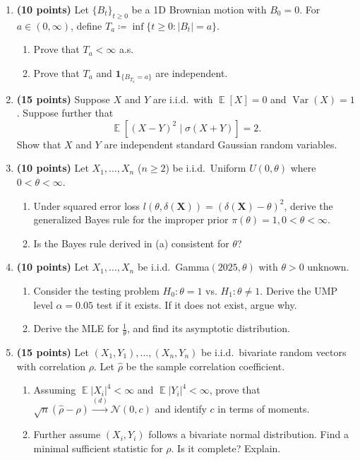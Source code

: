 \documentclass[11pt,a4paper]{article}
\DeclareMathOperator{\Var}{Var}
\DeclareMathOperator{\E}{\mathbb{E}}
\begin{document}
\begin{enumerate}[label=\textbf{\arabic*.}]
    \item \textbf{(10 points)} Let $\{B_t\}_{t \ge 0}$ be a 1D Brownian motion with $B_0 = 0$. For $a \in (0, \infty)$, define $T_a \coloneqq \inf\{t \ge 0 : |B_t| = a\}$.
    \begin{enumerate}[label=(\arabic*)]
        \item Prove that $T_a < \infty$ a.s.
        \item Prove that $T_a$ and $\mathbf{1}_{\{B_{T_a} = a\}}$ are independent.
    \end{enumerate}

    \item \textbf{(15 points)} Suppose $X$ and $Y$ are i.i.d.\ with $\E[X] = 0$ and $\Var(X) = 1$. Suppose further that
    \[
    \E [(X - Y)^2 \mid \sigma(X + Y)] = 2.
    \]
    Show that $X$ and $Y$ are independent standard Gaussian random variables.

    \item \textbf{(10 points)} Let $X_1, \dots, X_n$ ($n \ge 2$) be i.i.d.\ Uniform $U(0, \theta)$ where $0 < \theta < \infty$.
    \begin{enumerate}[label=(\alph*)]
        \item Under squared error loss $l(\theta, \delta(\mathbf{X})) = (\delta(\mathbf{X}) - \theta)^2$, derive the generalized Bayes rule for the improper prior $\pi(\theta) = 1, 0 < \theta < \infty$.
        \item Is the Bayes rule derived in (a) consistent for $\theta$?
    \end{enumerate}

    \item \textbf{(10 points)} Let $X_1, \dots, X_n$ be i.i.d.\ Gamma$(2025, \theta)$ with $\theta > 0$ unknown.
    \begin{enumerate}[label=(\alph*)]
        \item Consider the testing problem $H_0 : \theta = 1$ vs. $H_1 : \theta \neq 1$. Derive the UMP level $\alpha = 0.05$ test if it exists. If it does not exist, argue why.
        \item Derive the MLE for $\frac{1}{\theta}$, and find its asymptotic distribution.
    \end{enumerate}

    \item \textbf{(15 points)} Let $(X_1, Y_1), \dots, (X_n, Y_n)$ be i.i.d.\ bivariate random vectors with correlation $\rho$. Let $\hat{\rho}$ be the sample correlation coefficient.
    \begin{enumerate}[label=(\alph*)]
        \item Assuming $\E|X_i|^4 < \infty$ and $\E|Y_i|^4 < \infty$, prove that $\sqrt{n}(\hat{\rho} - \rho) \xrightarrow{(d)} \mathcal{N}(0, c)$ and identify $c$ in terms of moments.
        \item Further assume $(X_i, Y_i)$ follows a bivariate normal distribution. Find a minimal sufficient statistic for $\rho$. Is it complete? Explain.
    \end{enumerate}


\end{enumerate}
\end{document}
